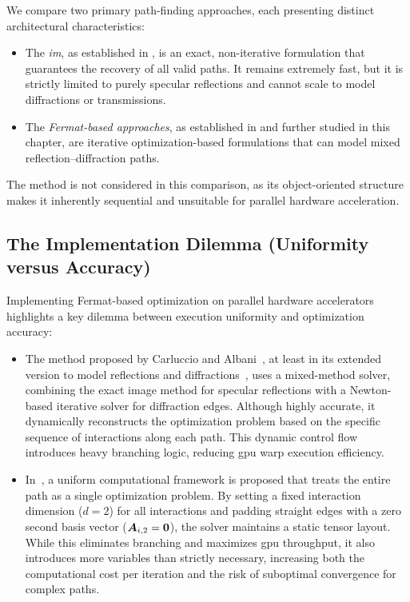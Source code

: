 We compare two primary path-finding approaches, each presenting distinct architectural characteristics:
\begin{itemize}
  \item The \emph{\gls{im}}, as established in , is an exact, non-iterative formulation that guarantees the recovery of all valid paths. It remains extremely fast, but it is strictly limited to purely specular reflections and cannot scale to model diffractions or transmissions.
  \item The \emph{Fermat-based approaches}, as established in  and further studied in this chapter, are iterative optimization-based formulations that can model mixed reflection--diffraction paths.
\end{itemize}

The  method is not considered in this comparison, as its object-oriented structure makes it inherently sequential and unsuitable for parallel hardware acceleration.

\subsection{The  Implementation Dilemma (Uniformity versus Accuracy)}

Implementing Fermat-based optimization on parallel hardware accelerators highlights a key dilemma between execution uniformity and optimization accuracy:
\begin{itemize}
  \item The method proposed by Carluccio and Albani~, at least in its extended version to model reflections and diffractions~, uses a mixed-method solver, combining the exact image method for specular reflections with a Newton-based iterative solver for diffraction edges. Although highly accurate, it dynamically reconstructs the optimization problem based on the specific sequence of interactions along each path. This dynamic control flow introduces heavy branching logic, reducing \gls{gpu} warp execution efficiency.
  \item In~, a uniform computational framework is proposed that treats the entire path as a single optimization problem. By setting a fixed interaction dimension ($d=2$) for all interactions and padding straight edges with a zero second basis vector ($\boldsymbol{A}_{i,2}=\mathbf{0}$), the solver maintains a static tensor layout. While this eliminates branching and maximizes \gls{gpu} throughput, it also introduces more variables than strictly necessary, increasing both the computational cost per iteration and the risk of suboptimal convergence for complex paths.
\end{itemize}

